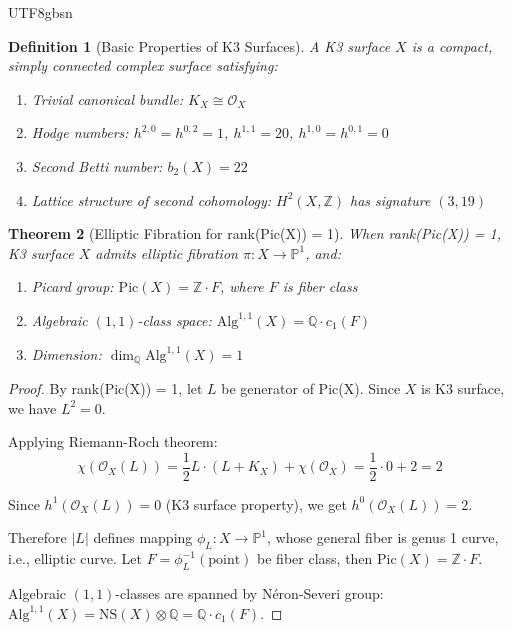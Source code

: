 \documentclass[a4paper,12pt]{extarticle}
\newtheorem{theorem}{Theorem}[section]
\newtheorem{definition}[theorem]{Definition}
\theoremstyle{definition}
\begin{document}
\begin{CJK}{UTF8}{gbsn}
\begin{definition}[Basic Properties of K3 Surfaces]
\label{def:k3_basic_properties}
A K3 surface $X$ is a compact, simply connected complex surface satisfying:
\begin{enumerate}
\item Trivial canonical bundle: $K_X \cong \mathcal{O}_X$
\item Hodge numbers: $h^{2,0} = h^{0,2} = 1$, $h^{1,1} = 20$, $h^{1,0} = h^{0,1} = 0$
\item Second Betti number: $b_2(X) = 22$
\item Lattice structure of second cohomology: $H^2(X,\mathbb{Z})$ has signature $(3,19)$
\end{enumerate}
\end{definition}

\begin{theorem}[Elliptic Fibration for rank(Pic(X)) = 1]
\label{thm:elliptic_fibration_rank_one}
When rank(Pic(X)) = 1, K3 surface $X$ admits elliptic fibration $\pi: X \to \mathbb{P}^1$, and:
\begin{enumerate}
\item Picard group: $\text{Pic}(X) = \mathbb{Z} \cdot F$, where $F$ is fiber class
\item Algebraic $(1,1)$-class space: $\text{Alg}^{1,1}(X) = \mathbb{Q} \cdot c_1(F)$
\item Dimension: $\dim_{\mathbb{Q}} \text{Alg}^{1,1}(X) = 1$
\end{enumerate}
\end{theorem}

\begin{proof}
By rank(Pic(X)) = 1, let $L$ be generator of Pic(X). Since $X$ is K3 surface, we have $L^2 = 0$.

Applying Riemann-Roch theorem:
$$\chi(\mathcal{O}_X(L)) = \frac{1}{2}L \cdot (L + K_X) + \chi(\mathcal{O}_X) = \frac{1}{2} \cdot 0 + 2 = 2$$

Since $h^1(\mathcal{O}_X(L)) = 0$ (K3 surface property), we get $h^0(\mathcal{O}_X(L)) = 2$.

Therefore $|L|$ defines mapping $\phi_L: X \to \mathbb{P}^1$, whose general fiber is genus 1 curve, i.e., elliptic curve. Let $F = \phi_L^{-1}(\text{point})$ be fiber class, then $\text{Pic}(X) = \mathbb{Z} \cdot F$.

Algebraic $(1,1)$-classes are spanned by Néron-Severi group: $\text{Alg}^{1,1}(X) = \text{NS}(X) \otimes \mathbb{Q} = \mathbb{Q} \cdot c_1(F)$.
\end{proof}


\end{CJK}
\end{document}
